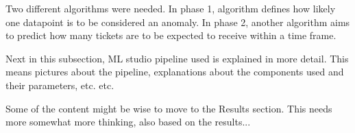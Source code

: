 Two different algorithms were needed.
In phase 1,
algorithm defines how likely one datapoint
is to be considered an anomaly.
In phase 2,
another algorithm aims to predict
how many tickets are to be expected to receive
within a time frame.


\begin{itcomment}
    Next in this subsection, ML studio pipeline used is explained in more detail.
    This means pictures about the pipeline,
    explanations about the components used and their parameters,
    etc. etc.

    Some of the content might be wise to move to the Results section.
    This needs more somewhat more thinking, also based on the results...
\end{itcomment}


%
%
%
%


